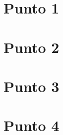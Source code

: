 \documentclass{article}
\begin{document}
\section*{Punto 1}


\pagebreak

\section*{Punto 2}


\pagebreak

\section*{Punto 3}


\pagebreak

\section*{Punto 4}

\end{document}

